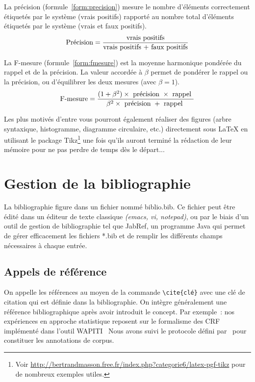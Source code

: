  La précision
(formule~\ref{form:precision}) mesure le nombre d'éléments
correctement étiquetés par le système (vrais positifs) rapporté au
nombre total d'éléments étiquetés par le système (vrais et faux
positifs).
%
\begin{equation}
  \centering
  \text{Précision} = {{\text{vrais positifs}}\over{\text{vrais positifs + faux positifs}}}
  \label{form:precision}
\end{equation}

 La F-mesure (formule~\ref{form:fmesure}) est la
moyenne harmonique pondérée du rappel et de la précision. La valeur
accordée à $\beta$ permet de pondérer le rappel ou la précision, ou
d'équilibrer les deux mesures (avec $\beta=1$).
%
\begin{equation}
  \centering
  \text{F-mesure} = {{(1+\beta^2) \times \text{ précision } \times \text{ rappel }}\over{\beta^2 \times \text{ précision } + \text{ rappel } }}
  \label{form:fmesure}
\end{equation}

Les plus motivés d'entre vous pourront également réaliser des figures
(arbre syntaxique, histogramme, diagramme circulaire, etc.)
directement sous \LaTeX{} en utilisant le package Tikz\footnote{Voir
  \url{http://bertrandmasson.free.fr/index.php?categorie6/latex-pgf-tikz}
  pour de nombreux exemples utiles.} une fois qu'ils auront terminé la
rédaction de leur mémoire pour ne pas perdre de temps dès le départ...



\section{Gestion de la bibliographie}
La  bibliographie figure dans un fichier nommé
\og{}biblio.bib\fg{}. Ce fichier peut être édité dans un éditeur de
texte classique \emph{(emacs, vi, notepad)}, ou par le biais d'un
outil de gestion de bibliographie tel que \textsf{JabRef}, un
programme Java qui permet de gérer efficacement les fichiers *.bib et
de remplir les différents champs nécessaires à chaque entrée.

\subsection{Appels de référence}
On appelle les références au moyen de la
commande \verb+\cite{clé}+ avec une clé de citation qui est définie
dans la bibliographie. On intègre généralement une référence
bibliographique après avoir introduit le concept. Par exemple~: nos
expériences en approche statistique reposent sur le formalisme des
CRF~	%
implémenté dans l'outil
WAPITI~%
Nous avons suivi le protocole défini
par~%
pour constituer les annotations de corpus.

